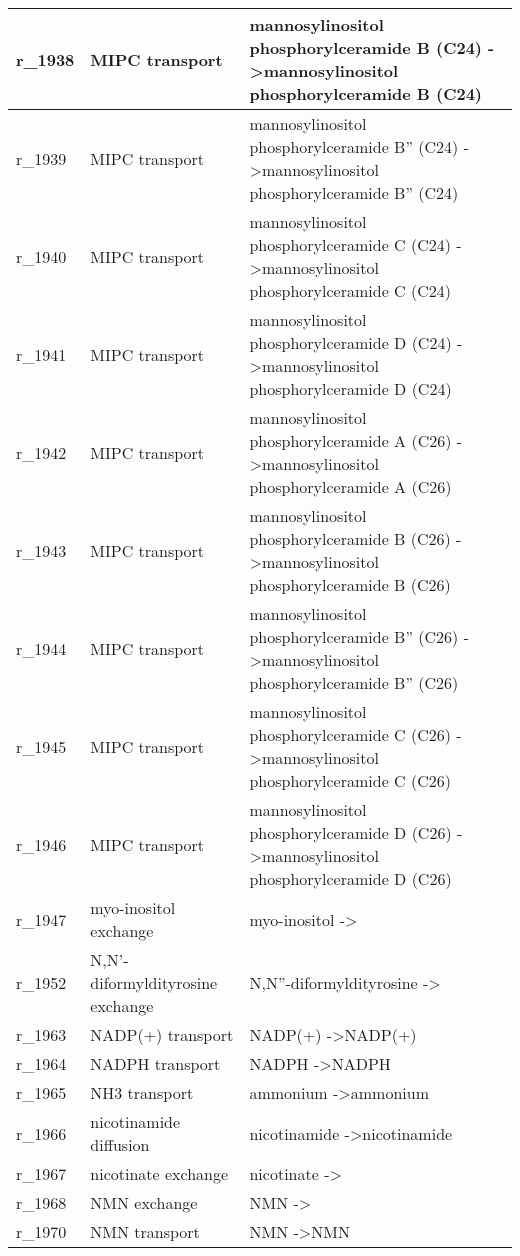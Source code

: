 \begin{landscape}
{\begin{longtable}{|l|p{7cm}|p{15cm}|}
r\_1938 & MIPC transport & mannosylinositol phosphorylceramide B (C24)  -\textgreater mannosylinositol phosphorylceramide B (C24) \\ \hline
r\_1939 & MIPC transport & mannosylinositol phosphorylceramide B'' (C24)  -\textgreater mannosylinositol phosphorylceramide B'' (C24) \\ \hline
r\_1940 & MIPC transport & mannosylinositol phosphorylceramide C (C24)  -\textgreater mannosylinositol phosphorylceramide C (C24) \\ \hline
r\_1941 & MIPC transport & mannosylinositol phosphorylceramide D (C24)  -\textgreater mannosylinositol phosphorylceramide D (C24) \\ \hline
r\_1942 & MIPC transport & mannosylinositol phosphorylceramide A (C26)  -\textgreater mannosylinositol phosphorylceramide A (C26) \\ \hline
r\_1943 & MIPC transport & mannosylinositol phosphorylceramide B (C26)  -\textgreater mannosylinositol phosphorylceramide B (C26) \\ \hline
r\_1944 & MIPC transport & mannosylinositol phosphorylceramide B'' (C26)  -\textgreater mannosylinositol phosphorylceramide B'' (C26) \\ \hline
r\_1945 & MIPC transport & mannosylinositol phosphorylceramide C (C26)  -\textgreater mannosylinositol phosphorylceramide C (C26) \\ \hline
r\_1946 & MIPC transport & mannosylinositol phosphorylceramide D (C26)  -\textgreater mannosylinositol phosphorylceramide D (C26) \\ \hline
r\_1947 & myo-inositol exchange & myo-inositol  -\textgreater{} \\ \hline
r\_1952 & N,N'-diformyldityrosine exchange & N,N''-diformyldityrosine  -\textgreater{} \\ \hline
r\_1963 & NADP(+) transport & NADP(+)  -\textgreater NADP(+) \\ \hline
r\_1964 & NADPH transport & NADPH  -\textgreater NADPH \\ \hline
r\_1965 & NH3 transport & ammonium  -\textgreater ammonium \\ \hline
r\_1966 & nicotinamide diffusion & nicotinamide  -\textgreater nicotinamide \\ \hline
r\_1967 & nicotinate exchange & nicotinate  -\textgreater{} \\ \hline
r\_1968 & NMN exchange & NMN  -\textgreater{} \\ \hline
r\_1970 & NMN transport & NMN  -\textgreater NMN \\ \hline

\end{longtable}}
\end{landscape}
